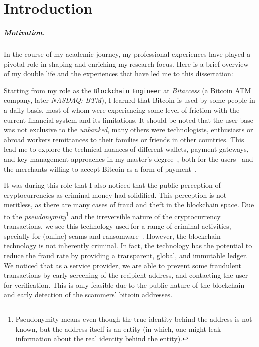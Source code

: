 

\chapter{Introduction} \label{sec:intro}



\paragraph{Motivation.} In the course of my academic journey, my professional experiences have played a pivotal role in shaping and enriching my research focus. Here is a brief overview of my double life and the experiences that have led me to this dissertation: %

Starting from my role as the \texttt{Blockchain Engineer} at \textit{Bitaccess} (a Bitcoin ATM company, later \textit{NASDAQ: BTM}), I learned that Bitcoin is used by some people in a daily basis, most of whom were experiencing some level of friction with the current financial system and its limitations. It should be noted that the user base was not exclusive to the \textit{unbanked}, many others were technologists, enthusiasts or abroad workers remittances to their families or friends in other countries. This lead me to explore the technical nuances of different wallets, payment gateways, and key management approaches in my master’s degree~\cite{eskandari2015real}, both for the users~\cite{EBSC15} and the merchants willing to accept Bitcoin as a form of payment~\cite{eskandari2016buy}.

It was during this role that I also noticed that the public perception of cryptocurrencies as criminal money had solidified. This perception is not meritless, as there are many cases of fraud and theft in the blockchain space. Due to the \textit{pseudonymity}\footnote{Pseudonymity means even though the true identity behind the address is not known, but the address itself is an entity (in which, one might leak information about the real identity behind the entity).} and the irreversible nature of the cryptocurrency transactions, we see this technology used for a range of criminal activities, specially for (online) scams and ransomware~\cite{paquet2019ransomware,conti2018economic}. However, the blockchain technology is not inherently criminal. In fact, the technology has the potential to reduce the fraud rate by providing a transparent, global, and immutable ledger. We noticed that as a service provider, we are able to prevent some fraudulent transactions by early screening of the recipient address, and contacting the user for verification. This is only feasible due to the public nature of the blockchain and early detection of the scammers' bitcoin addresses.

